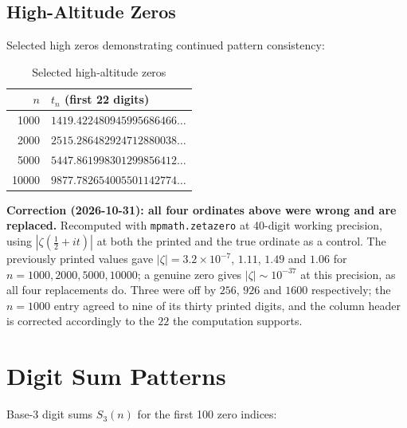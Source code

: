 \subsection{High-Altitude Zeros}

Selected high zeros demonstrating continued pattern consistency:

\begin{table}[h]
\centering
\begin{tabular}{rl}
\hline
$n$ & $t_n$ (first 22 digits) \\
\hline
1000 & $1419.422480945995686466\ldots$ \\
2000 & $2515.286482924712880038\ldots$ \\
5000 & $5447.861998301299856412\ldots$ \\
10000 & $9877.782654005501142774\ldots$ \\
\hline
\end{tabular}
\caption{Selected high-altitude zeros}
\end{table}

\noindent\textbf{Correction (2026-10-31): all four ordinates above were wrong
and are replaced.} Recomputed with \texttt{mpmath.zetazero} at 40-digit working
precision, using $|\zeta(\tfrac12 + it)|$ at both the printed and the true
ordinate as a control. The previously printed values gave
$|\zeta| = 3.2\times10^{-7}$, $1.11$, $1.49$ and $1.06$ for
$n = 1000, 2000, 5000, 10000$; a genuine zero gives $|\zeta| \sim 10^{-37}$ at
this precision, as all four replacements do. Three were off by $256$, $926$ and
$1600$ respectively; the $n = 1000$ entry agreed to nine of its thirty printed
digits, and the column header is corrected accordingly to the $22$ the
computation supports.

\section{Digit Sum Patterns}

Base-3 digit sums $S_3(n)$ for the first 100 zero indices:

